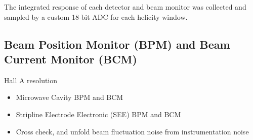 The integrated response of each detector and beam monitor was collected and sampled 
by a custom 18-bit ADC for each helicity window.
\subsection{Beam Position Monitor (BPM) and Beam Current Monitor (BCM)}
Hall A resolution

\begin{itemize}
    \item Microwave Cavity BPM and BCM
    \item Stripline Electrode Electronic (SEE) BPM and BCM
    \item Cross check, and unfold beam fluctuation noise from instrumentation noise
\end{itemize}
